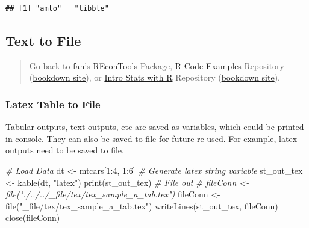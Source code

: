 \documentclass[
]{book}
\newenvironment{Shaded}{\begin{snugshade}}{\end{snugshade}}
\newcommand{\CommentTok}[1]{\textcolor[rgb]{0.56,0.35,0.01}{\textit{#1}}}
\newcommand{\DecValTok}[1]{\textcolor[rgb]{0.00,0.00,0.81}{#1}}
\newcommand{\FunctionTok}[1]{\textcolor[rgb]{0.00,0.00,0.00}{#1}}
\newcommand{\NormalTok}[1]{#1}
\newcommand{\OtherTok}[1]{\textcolor[rgb]{0.56,0.35,0.01}{#1}}
\newcommand{\SpecialCharTok}[1]{\textcolor[rgb]{0.00,0.00,0.00}{#1}}
\newcommand{\StringTok}[1]{\textcolor[rgb]{0.31,0.60,0.02}{#1}}
\begin{document}
\begin{verbatim}
## [1] "amto"   "tibble"
\end{verbatim}

\hypertarget{text-to-file}{%
\subsection{Text to File}\label{text-to-file}}

\begin{quote}
Go back to \href{http://fanwangecon.github.io/}{fan}'s \href{https://fanwangecon.github.io/REconTools/}{REconTools} Package, \href{https://fanwangecon.github.io/R4Econ/}{R Code Examples} Repository (\href{https://fanwangecon.github.io/R4Econ/bookdown}{bookdown site}), or \href{https://fanwangecon.github.io/Stat4Econ/}{Intro Stats with R} Repository (\href{https://fanwangecon.github.io/Stat4Econ/bookdown}{bookdown site}).
\end{quote}

\hypertarget{latex-table-to-file}{%
\subsubsection{Latex Table to File}\label{latex-table-to-file}}

Tabular outputs, text outputs, etc are saved as variables, which could be printed in console. They can also be saved to file for future re-used. For example, latex outputs need to be saved to file.

\begin{Shaded}
\begin{Highlighting}[]
\CommentTok{\# Load Data}
\NormalTok{dt }\OtherTok{\textless{}{-}}\NormalTok{ mtcars[}\DecValTok{1}\SpecialCharTok{:}\DecValTok{4}\NormalTok{, }\DecValTok{1}\SpecialCharTok{:}\DecValTok{6}\NormalTok{]}
\CommentTok{\# Generate latex string variable}
\NormalTok{st\_out\_tex }\OtherTok{\textless{}{-}} \FunctionTok{kable}\NormalTok{(dt, }\StringTok{"latex"}\NormalTok{)}
\FunctionTok{print}\NormalTok{(st\_out\_tex)}
\CommentTok{\# File out}
\CommentTok{\# fileConn \textless{}{-} file("./../../\_file/tex/tex\_sample\_a\_tab.tex")}
\NormalTok{fileConn }\OtherTok{\textless{}{-}} \FunctionTok{file}\NormalTok{(}\StringTok{"\_file/tex/tex\_sample\_a\_tab.tex"}\NormalTok{)}
\FunctionTok{writeLines}\NormalTok{(st\_out\_tex, fileConn)}
\FunctionTok{close}\NormalTok{(fileConn)}
\end{Highlighting}
\end{Shaded}
\end{document}

